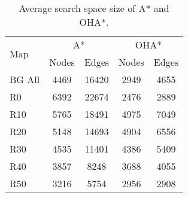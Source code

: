 \begin{table}
  \caption{Average search space size of A* and OHA*.}
  \label{table-graphsize}
  \centering
  \begin{tabular}{lcccc}
   \hline
  \multirow{2}{*}{Map} & \multicolumn{2}{c}{A*} & \multicolumn{2}{c}{OHA*} \\
	\cline{2-3}
	\cline{4-5}
	& Nodes & Edges & Nodes & Edges \\
\hline
BG All &  4469 & 16420 & 2949 &  4655 \\
R0 & 6392 & 22674 & 2476 & 2889 \\
R10 & 5765 & 18491 & 4975 & 7049 \\
R20 & 5148 & 14693  & 4904 & 6556 \\ 
R30 & 4535 & 11401 & 4386 & 5409 \\
R40 & 3857 & 8248 & 3688 & 4055 \\
R50 & 3216 & 5754 & 2956 & 2908 \\ 
   \hline
\end{tabular}
\end{table}

